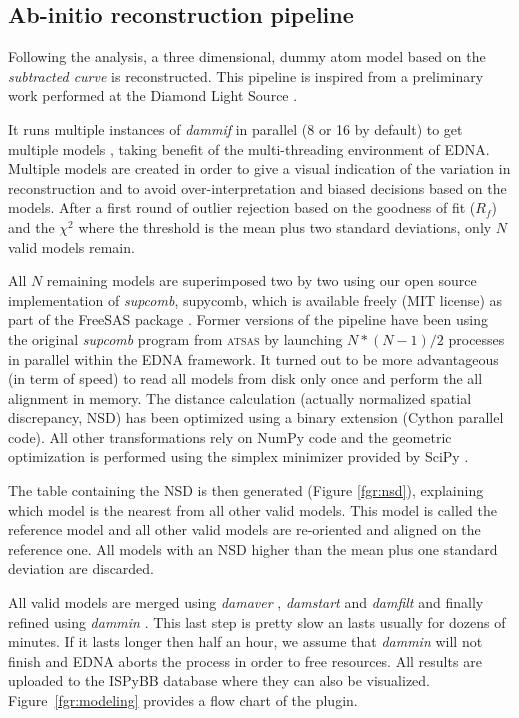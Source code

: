 \documentclass[preprint,pdf]{iucr}              %
\begin{document}
\subsection{Ab-initio reconstruction pipeline}
\label{abinitio}
Following the analysis, a three dimensional, dummy atom model based
on the \textit{subtracted curve} is reconstructed.
This pipeline is inspired from a preliminary work
performed at the Diamond Light Source \cite{DiamondSE}.

It runs multiple instances of \textit{dammif} in parallel (8 or 16 by default)
to get multiple models \cite{dammif}, taking benefit of the multi-threading
environment of EDNA.
Multiple models are created in order to give a visual indication of the variation in
reconstruction and to avoid over-interpretation and biased decisions based on
the models.
After a first round of outlier rejection based on the goodness of fit ($R_{f}$)
and the $\chi^{2}$ where the threshold is the mean plus two standard
deviations, only $N$ valid models remain.

All $N$ remaining models are superimposed two by two using
our open source implementation of \textit{supcomb}, supycomb, which is available freely
(MIT license) as part of the FreeSAS package \cite{freesas}.
Former versions of the pipeline have been using the original
\textit{supcomb} \cite{supcomb} program from \textsc{atsas} by launching
$N*(N-1)/2$ processes in parallel within the EDNA framework.
It turned out to be more advantageous (in term of speed) to read all models
from disk only once and perform the all alignment in memory.
The distance calculation (actually normalized spatial discrepancy, NSD) has
been optimized using a binary extension (Cython parallel code).
All other transformations rely on NumPy \cite{numpy} code and the geometric
optimization is performed using the simplex minimizer provided by SciPy \cite{scipy}.

The table containing the NSD is then generated
(Figure \ref{fgr:nsd}), explaining which model is the nearest from all other
valid models. This model is called the reference model and all other valid
models are re-oriented and aligned on the reference one.
All models with an NSD higher than the mean plus one standard deviation are
discarded.

All valid models are merged using \textit{damaver} \cite{damaver}, \textit{damstart} and
\textit{damfilt} and finally refined using \textit{dammin} \cite{dammin}.
This last step is pretty slow an lasts usually for dozens of minutes. 
If it lasts longer then half an hour, we assume that \textit{dammin} will not finish and 
EDNA aborts the process in order to free resources. 
All results are uploaded to the ISPyBB database where they can also be
visualized. Figure~\ref{fgr:modeling} provides a flow chart of the plugin.
\end{document}
